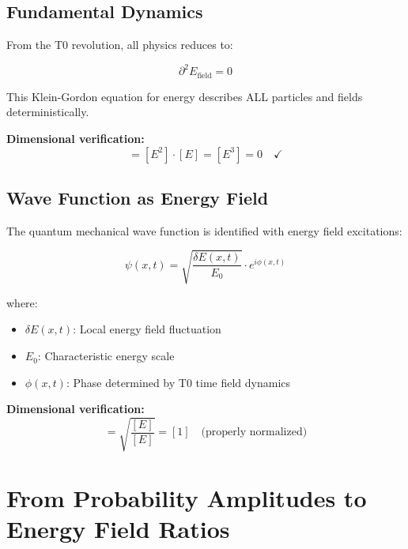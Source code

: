 \documentclass[12pt,a4paper]{report}
\begin{document}
\subsection{Fundamental Dynamics}
\label{subsec:fundamental_dynamics}

From the T0 revolution, all physics reduces to:

\begin{equation}
	\boxed{\partial^2 E_{\text{field}} = 0}
	\label{eq:universal_field_equation}
\end{equation}

This Klein-Gordon equation for energy describes ALL particles and fields deterministically.

\textbf{Dimensional verification:}
\begin{equation}
	[\partial^2 E_{\text{field}}] = [E^2] \cdot [E] = [E^3] = 0 \quad \checkmark
\end{equation}

\subsection{Wave Function as Energy Field}
\label{subsec:wave_function_energy_field}

The quantum mechanical wave function is identified with energy field excitations:

\begin{equation}
	\psi(x,t) = \sqrt{\frac{\delta E(x,t)}{E_0}} \cdot e^{i\phi(x,t)}
	\label{eq:wave_function_energy}
\end{equation}

where:
\begin{itemize}
	\item $\delta E(x,t)$: Local energy field fluctuation
	\item $E_0$: Characteristic energy scale
	\item $\phi(x,t)$: Phase determined by T0 time field dynamics
\end{itemize}

\textbf{Dimensional verification:}
\begin{equation}
	[\psi] = \sqrt{\frac{[E]}{[E]}} = [1] \quad \text{(properly normalized)}
\end{equation}

\section{From Probability Amplitudes to Energy Field Ratios}
\label{sec:amplitudes_to_ratios}
\end{document}
